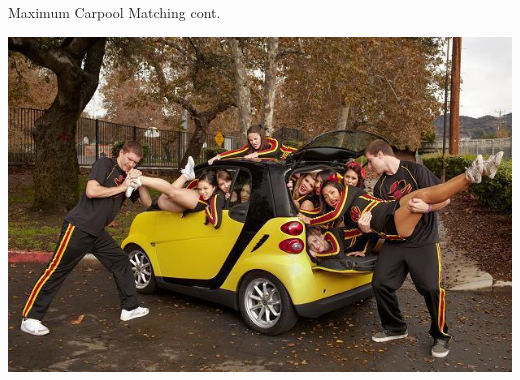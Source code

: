 \begin{frame}{Maximum Carpool Matching cont.}
\begin{center}
\includegraphics[scale=.5]{capacity}
\end{center}
\end{frame}